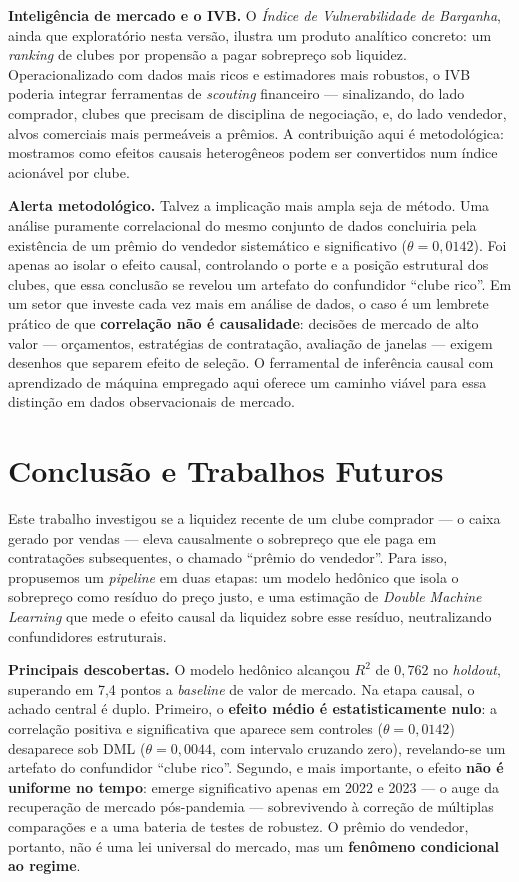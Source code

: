 \documentclass[12pt]{article}
\begin{document}
\textbf{Inteligência de mercado e o IVB.} O \textit{Índice de Vulnerabilidade de Barganha}, ainda que
exploratório nesta versão, ilustra um produto analítico concreto: um \textit{ranking} de clubes por
propensão a pagar sobrepreço sob liquidez. Operacionalizado com dados mais ricos e estimadores mais
robustos, o IVB poderia integrar ferramentas de \textit{scouting} financeiro — sinalizando, do lado
comprador, clubes que precisam de disciplina de negociação, e, do lado vendedor, alvos comerciais
mais permeáveis a prêmios. A contribuição aqui é metodológica: mostramos como efeitos causais
heterogêneos podem ser convertidos num índice acionável por clube.

\textbf{Alerta metodológico.} Talvez a implicação mais ampla seja de método. Uma análise puramente
correlacional do mesmo conjunto de dados concluiria pela existência de um prêmio do vendedor
sistemático e significativo ($\theta = 0{,}0142$). Foi apenas ao isolar o efeito causal, controlando
o porte e a posição estrutural dos clubes, que essa conclusão se revelou um artefato do confundidor
``clube rico''. Em um setor que investe cada vez mais em análise de dados, o caso é um lembrete
prático de que \textbf{correlação não é causalidade}: decisões de mercado de alto valor — orçamentos,
estratégias de contratação, avaliação de janelas — exigem desenhos que separem efeito de seleção.
O ferramental de inferência causal com aprendizado de máquina empregado aqui oferece um caminho
viável para essa distinção em dados observacionais de mercado.


\section{Conclusão e Trabalhos Futuros}

Este trabalho investigou se a liquidez recente de um clube comprador — o caixa gerado por vendas —
eleva causalmente o sobrepreço que ele paga em contratações subsequentes, o chamado ``prêmio do
vendedor''. Para isso, propusemos um \textit{pipeline} em duas etapas: um modelo hedônico que isola
o sobrepreço como resíduo do preço justo, e uma estimação de \textit{Double Machine Learning} que
mede o efeito causal da liquidez sobre esse resíduo, neutralizando confundidores estruturais.

\textbf{Principais descobertas.} O modelo hedônico alcançou $R^2$ de $0{,}762$ no \textit{holdout},
superando em 7,4 pontos a \textit{baseline} de valor de mercado. Na etapa causal, o achado central é
duplo. Primeiro, o \textbf{efeito médio é estatisticamente nulo}: a correlação positiva e
significativa que aparece sem controles ($\theta = 0{,}0142$) desaparece sob DML
($\theta = 0{,}0044$, com intervalo cruzando zero), revelando-se um artefato do confundidor ``clube
rico''. Segundo, e mais importante, o efeito \textbf{não é uniforme no tempo}: emerge significativo
apenas em 2022 e 2023 — o auge da recuperação de mercado pós-pandemia — sobrevivendo à correção de
múltiplas comparações e a uma bateria de testes de robustez. O prêmio do vendedor, portanto, não é
uma lei universal do mercado, mas um \textbf{fenômeno condicional ao regime}.
\end{document}

